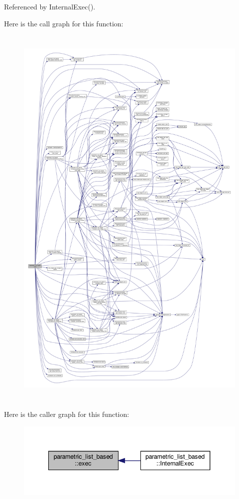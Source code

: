 Referenced by Internal\+Exec().

Here is the call graph for this function\+:
\nopagebreak
\begin{figure}[H]
\begin{center}
\leavevmode
\includegraphics[height=550pt]{d7/d47/classparametric__list__based_abc6a741625056fc292a4ef5e58297ad4_cgraph}
\end{center}
\end{figure}
Here is the caller graph for this function\+:
\nopagebreak
\begin{figure}[H]
\begin{center}
\leavevmode
\includegraphics[width=340pt]{d7/d47/classparametric__list__based_abc6a741625056fc292a4ef5e58297ad4_icgraph}
\end{center}
\end{figure}
\mbox{\label{classparametric__list__based_a33b5a6aadaf0f36b342b434126ebbf79}} 
